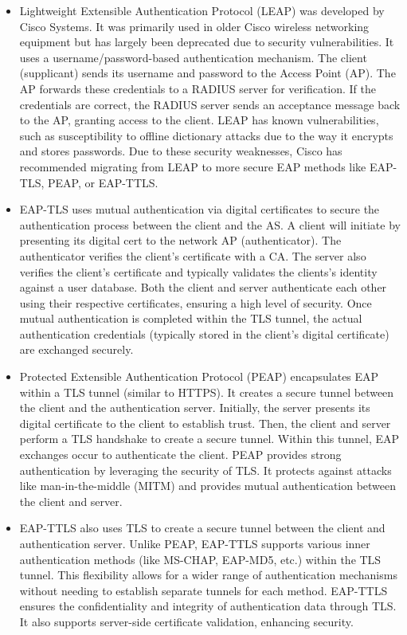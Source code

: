 \documentclass{article}
\begin{document}
\begin{itemize}
	\item[] Lightweight Extensible Authentication Protocol (LEAP) was developed by Cisco Systems. It was primarily used in older Cisco wireless networking equipment but has largely been deprecated due to security vulnerabilities. It uses a username/password-based authentication mechanism. The client (supplicant) sends its username and password to the Access Point (AP). The AP forwards these credentials to a RADIUS server for verification. If the credentials are correct, the RADIUS server sends an acceptance message back to the AP, granting access to the client. LEAP has known vulnerabilities, such as susceptibility to offline dictionary attacks due to the way it encrypts and stores passwords. Due to these security weaknesses, Cisco has recommended migrating from LEAP to more secure EAP methods like EAP-TLS, PEAP, or EAP-TTLS.\\
	\item[] EAP-TLS uses mutual authentication via digital certificates to secure the authentication process between the client and the AS. A client will initiate by presenting its digital cert to the network AP (authenticator). The authenticator verifies the client's certificate with a CA. The server also verifies the client's certificate and typically validates the clients's identity against a user database. Both the client and server authenticate each other using their respective certificates, ensuring a high level of security. Once mutual authentication is completed within the TLS tunnel, the actual authentication credentials (typically stored in the client's digital certificate) are exchanged securely.
	\item[] Protected Extensible Authentication Protocol (PEAP) encapsulates EAP within a TLS tunnel (similar to HTTPS). It creates a secure tunnel between the client and the authentication server. Initially, the server presents its digital certificate to the client to establish trust. Then, the client and server perform a TLS handshake to create a secure tunnel. Within this tunnel, EAP exchanges occur to authenticate the client. PEAP provides strong authentication by leveraging the security of TLS. It protects against attacks like man-in-the-middle (MITM) and provides mutual authentication between the client and server.
	\item[] EAP-TTLS also uses TLS to create a secure tunnel between the client and authentication server. Unlike PEAP, EAP-TTLS supports various inner authentication methods (like MS-CHAP, EAP-MD5, etc.) within the TLS tunnel. This flexibility allows for a wider range of authentication mechanisms without needing to establish separate tunnels for each method. EAP-TTLS ensures the confidentiality and integrity of authentication data through TLS. It also supports server-side certificate validation, enhancing security.

\end{itemize}
\end{document}
